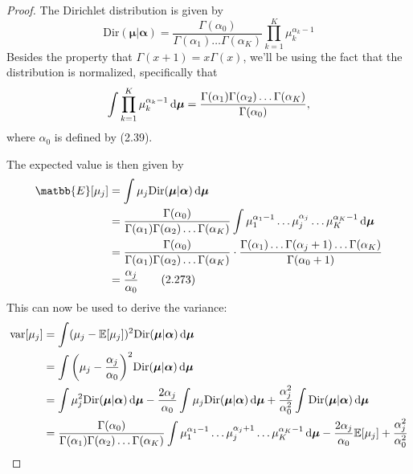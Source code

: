 \begin{proof}
    The Dirichlet distribution is given by
    \begin{equation}\label{eq:2.38}\tag{2.38}
        \text{Dir}(\bm{\mu} | \bm{\alpha})
        = \frac{\Gamma(\alpha_0)}{\Gamma(\alpha_1)\ldots\Gamma(\alpha_K)}
        \prod_{k = 1}^K \mu_k^{\alpha_k - 1}
    \end{equation}
    Besides the property that $\Gamma(x+1) = x\Gamma(x)$, we'll be using the fact that the distribution is normalized,
    specifically that
    \[
        \int \prod_{k = 1}^K \mu_k^{\alpha_k - 1} \mathop{}\!\mathrm{d} \bm{\mu}
        = \frac{\Gamma(\alpha_1)\Gamma(\alpha_2)\ldots\Gamma(\alpha_K)}{\Gamma(\alpha_0)},
    \]
    where $\alpha_0$ is defined by (2.39).

    The expected value is then given by
    \begin{align*}
        \matbb{E}[\mu_j] 
        &= \int \mu_j \text{Dir}(\bm{\mu} | \bm{\alpha}) \diff \bm{\mu} \\
        &= \frac{\Gamma(\alpha_0)}{\Gamma(\alpha_1)\Gamma(\alpha_2)\ldots\Gamma(\alpha_K)}
        \int \mu_1^{\alpha_1 - 1}\dots\mu_j^{\alpha_j}\ldots\mu_K^{\alpha_K - 1} \diff \bm{\mu} \\
        &= \frac{\Gamma(\alpha_0)}{\Gamma(\alpha_1)\Gamma(\alpha_2)\ldots\Gamma(\alpha_K)}
        \cdot \frac{\Gamma(\alpha_1)\ldots\Gamma(\alpha_j + 1)\ldots\Gamma(\alpha_K)}
        {\Gamma(\alpha_0 + 1)} \\
        &= \frac{\alpha_j}{\alpha_0} 
        \tag{2.273}
    \end{align*}
    This can now be used to derive the variance:
    \begin{align*}
        \text{var}[\mu_j] 
        &= \int (\mu_j - \mathbb{E}[\mu_j])^2 \text{Dir}(\bm{\mu} | \bm{\alpha}) \diff \bm{\mu} \\
        &= \int \bigg(\mu_j - \frac{\alpha_j}{\alpha_0}\bigg)^2 
        \text{Dir}(\bm{\mu} | \bm{\alpha}) \diff \bm{\mu} \\
        &= \int \mu_j^2 \text{Dir}(\bm{\mu} | \bm{\alpha}) \diff \bm{\mu}
        - \frac{2\alpha_j}{\alpha_0}\int \mu_j\text{Dir}(\bm{\mu} | \bm{\alpha}) \diff \bm{\mu}
        + \frac{\alpha_j^2}{\alpha_0^2} \int \text{Dir}(\bm{\mu} | \bm{\alpha}) \diff \bm{\mu} \\
        &= \frac{\Gamma(\alpha_0)}{\Gamma(\alpha_1)\Gamma(\alpha_2)\ldots\Gamma(\alpha_K)}
        \int \mu_1^{\alpha_1 - 1}\dots\mu_j^{\alpha_j + 1}\ldots\mu_K^{\alpha_K - 1} \diff \bm{\mu} 
        - \frac{2\alpha_j}{\alpha_0} \mathbb{E}[\mu_j] + \frac{\alpha_j^2}{\alpha_0^2} \\

\end{align*}
\end{proof}
